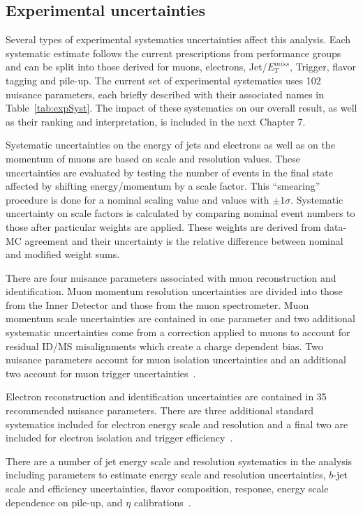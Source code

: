 \subsection{Experimental uncertainties}
Several types of experimental systematics uncertainties affect this analysis. Each systematic estimate follows the current prescriptions from performance groups and can be split into those derived for muons, electrons, Jet/$E_T^{miss}$, Trigger, flavor tagging and pile-up. The current set of experimental systematics uses 102 nuisance parameters, each briefly described with their associated names in Table~\ref{tab:expSyst}. The impact of these systematics on our overall result, as well as their ranking and interpretation, is included in the next Chapter 7. 
 
Systematic uncertainties on the energy of jets and electrons as well as on the momentum of muons are based on scale and resolution values. These uncertainties are evaluated by testing the number of events in the final state affected by shifting energy/momentum by a scale factor. This ``smearing'' procedure is done for a nominal scaling value and values with $\pm 1 \sigma$. Systematic uncertainty on scale factors is calculated by comparing nominal event numbers to those after particular weights are applied. These weights are derived from data-MC agreement and their uncertainty is the relative difference between nominal and modified weight sums.  
 
There are four nuisance parameters associated with muon reconstruction and identification. Muon momentum resolution uncertainties are divided into those from the Inner Detector and those from the muon spectrometer. Muon momentum scale uncertainties are contained in one parameter and two additional systematic uncertainties come from a correction applied to muons to account for residual ID/MS misalignments which create a charge dependent bias. Two nuisance parameters account for muon isolation uncertainties and an additional two account for muon trigger uncertainties~\cite{MCPpaper}.  

Electron reconstruction and identification uncertainties are contained in 35 recommended nuisance parameters. There are three additional standard systematics included for electron energy scale and resolution and a final two are included for electron isolation and trigger efficiency~\cite{ElectronPhotonPerformance}.

There are a number of jet energy scale and resolution systematics in the analysis including parameters to estimate energy scale and resolution uncertainties, $b$-jet scale and efficiency uncertainties, flavor composition, response, energy scale dependence on pile-up, and $\eta$ calibrations~\cite{JETEtmiss}.

